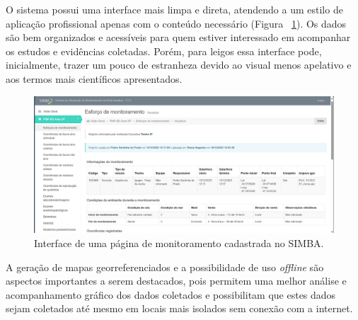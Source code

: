 O sistema possui uma interface mais limpa e direta, atendendo a um estilo de aplicação profissional apenas com o conteúdo necessário (Figura ~\ref{fig:simbaPaginaCadastro}). Os dados são bem organizados e acessíveis para quem estiver interessado em acompanhar os estudos e evidências coletadas. Porém, para leigos essa interface pode, inicialmente, trazer um pouco de estranheza devido ao visual menos apelativo e aos termos mais científicos apresentados.

\begin{figure}[htb]
  \centering
  \includegraphics[width=1\textwidth]{imagens/simbaMonitoramento.png}
  \caption{Interface de uma página de monitoramento cadastrada no SIMBA.}
  \label{fig:simbaPaginaCadastro}
\end{figure}

A geração de mapas georreferenciados e a possibilidade de uso \textit{offline} são aspectos importantes a serem destacados, pois permitem uma melhor análise e acompanhamento gráfico dos dados coletados e possibilitam que estes dados sejam coletados até mesmo em locais mais isolados sem conexão com a internet.
